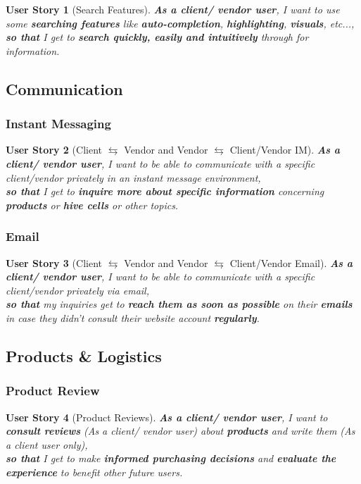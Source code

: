 \documentclass[a4paper,12pt]{book}
\theoremstyle{break}
\newtheorem{userStory}{User Story}
\theoremstyle{break}
\theoremstyle{break}
\theoremstyle{break}
\theoremstyle{definition}
\theoremstyle{remark}
\begin{document}
\begin{userStory}[Search Features]
\textbf{As a {\color{green} client}/{\color{red} vendor} user}, I want to use some \textbf{searching features} like \textbf{auto-completion}, \textbf{highlighting}, \textbf{visuals}, etc...,\\
\indent
\textbf{so that} I get to \textbf{search quickly, easily and intuitively} through for information.
\end{userStory}

\subsection{Communication}
\subsubsection{Instant Messaging}
\begin{userStory}[Client $\leftrightarrows$ Vendor and Vendor $\leftrightarrows$ Client/Vendor IM]
\textbf{As a {\color{green} client}/{\color{red} vendor} user}, I want to be able to communicate with a specific client/vendor privately in an instant message environment,\\
\indent
\textbf{so that} I get to \textbf{inquire more about specific information} concerning \textbf{products} or \textbf{hive cells} or other topics.
\end{userStory}

\subsubsection{Email}
\begin{userStory}[Client $\leftrightarrows$ Vendor and Vendor $\leftrightarrows$ Client/Vendor Email]
\textbf{As a {\color{green} client}/{\color{red} vendor} user}, I want to be able to communicate with a specific client/vendor privately via email,\\
\indent
\textbf{so that} my inquiries get to \textbf{reach them as soon as possible} on their \textbf{emails} in case they didn't consult their website account \textbf{regularly}.
\end{userStory}

\subsection{Products \& Logistics}
\subsubsection{Product Review}
\begin{userStory}[Product Reviews]
\textbf{As a {\color{green} client}/{\color{red} vendor} user}, I want to \textbf{consult reviews} (As a {\color{green} client}/{\color{red} vendor} user) about \textbf{products} and write them (As a {\color{green} client} user only),\\
\indent
\textbf{so that} I get to make \textbf{informed purchasing decisions} and \textbf{evaluate the experience} to benefit other future users.
\end{userStory}
\end{document}
